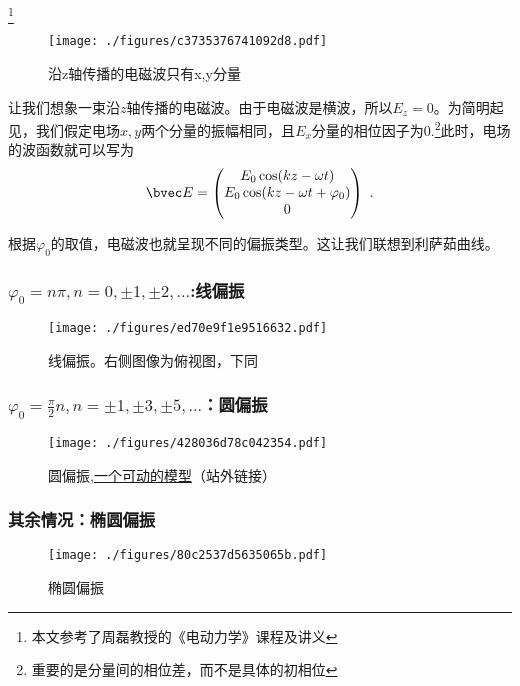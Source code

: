 
\begin{issues}
\issueDraft
\end{issues}

\footnote{本文参考了周磊教授的《电动力学》课程及讲义}

\begin{figure}[ht]
\centering
\texttt{[image: ./figures/c3735376741092d8.pdf]}
\caption{沿z轴传播的电磁波只有x,y分量} \label{fig_PLREMW_1}
\end{figure}

让我们想象一束沿$z$轴传播的电磁波。由于电磁波是横波，所以$E_z=0$。为简明起见，我们假定电场$x,y$两个分量的振幅相同，且$E_x$分量的相位因子为0.\footnote{重要的是分量间的相位差，而不是具体的初相位}此时，电场的波函数就可以写为
\begin{equation}
\bvec E = 
\begin{pmatrix}
E_{0} \cos(kz - \omega t)\\
E_{0} \cos(kz - \omega t+\varphi_{0})\\
0\\
\end{pmatrix}~.
\end{equation}

根据$\varphi_0$的取值，电磁波也就呈现不同的偏振类型。这让我们联想到利萨茹曲线。

\subsubsection{$\varphi_0=n\pi, n=0,\pm1,\pm2,...$:线偏振}
\begin{figure}[ht]
\centering
\texttt{[image: ./figures/ed70e9f1e9516632.pdf]}
\caption{线偏振。右侧图像为俯视图，下同} \label{fig_PLREMW_2}
\end{figure}

\subsubsection{$\varphi_0=\frac{\pi}{2}n, n=\pm1,\pm3,\pm5,...$：圆偏振}
\begin{figure}[ht]
\centering
\texttt{[image: ./figures/428036d78c042354.pdf]}
\caption{圆偏振,\href{https://www.geogebra.org/m/hj6qsfdu}{一个可动的模型}（站外链接）} \label{fig_PLREMW_3}
\end{figure}

\subsubsection{其余情况：椭圆偏振}
\begin{figure}[ht]
\centering
\texttt{[image: ./figures/80c2537d5635065b.pdf]}
\caption{椭圆偏振} \label{fig_PLREMW_4}
\end{figure}

